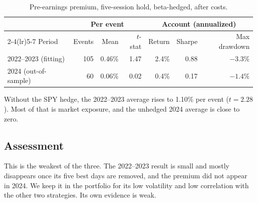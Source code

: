 \documentclass[../main.tex]{subfiles}
\begin{document}
\begin{table}[ht]\centering\small
\caption{Pre-earnings premium, five-session hold, beta-hedged, after costs.}\label{tab:pre}
\begin{tabular}{lrrrrrr}
\toprule
 & \multicolumn{3}{c}{Per event} & \multicolumn{3}{c}{Account (annualized)} \\
\cmidrule(lr){2-4}\cmidrule(lr){5-7}
Period & Events & Mean & $t$-stat & Return & Sharpe & Max drawdown \\
\midrule
2022--2023 (fitting) & 105 & 0.46\% & 1.47 & 2.4\% & 0.88 & $-3.3\%$ \\
2024 (out-of-sample) & 60 & 0.06\% & 0.02 & 0.4\% & 0.17 & $-1.4\%$ \\
\bottomrule
\end{tabular}
\end{table}

Without the SPY hedge, the 2022--2023 average rises to 1.10\% per event ($t = 2.28$). Most of that is market exposure, and the unhedged 2024 average is close to zero.

\subsection{Assessment}
This is the weakest of the three. The 2022--2023 result is small and mostly disappears once its five best days are removed, and the premium did not appear in 2024. We keep it in the portfolio for its low volatility and low correlation with the other two strategies. Its own evidence is weak.

\ifSubfilesClassLoaded{}{}
\end{document}
